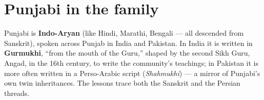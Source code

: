 \section*{Punjabi in the family}

Punjabi is \textbf{Indo-Aryan} (like Hindi, Marathi, Bengali — all descended from Sanskrit), spoken across Punjab in India and Pakistan. In India it is written in \textbf{Gurmukhi}, \textquotedblleft{}from the mouth of the Guru,\textquotedblright{} shaped by the second Sikh Guru, Angad, in the 16th century, to write the community's teachings; in Pakistan it is more often written in a Perso-Arabic script (\emph{Shahmukhi}) — a mirror of Punjabi's own twin inheritances. The lessons trace both the Sanskrit and the Persian threads.
